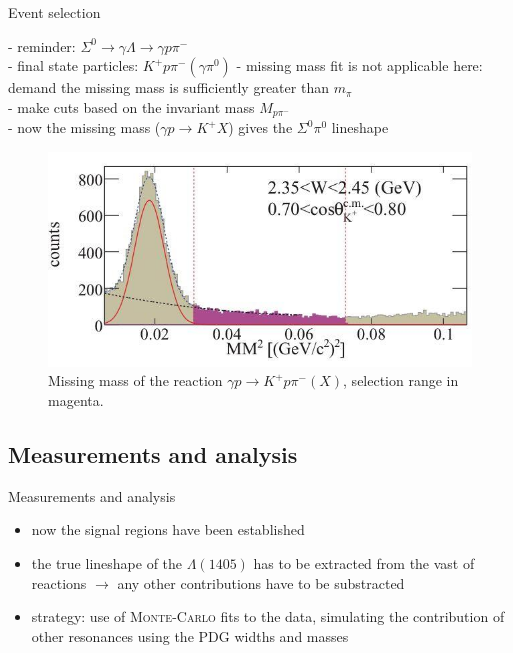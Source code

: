 \documentclass[11pt,aspectratio=1610,dvipsnames]{beamer}
\begin{document}
\begin{frame}{Event selection}
	\begin{minipage}{\linewidth}
		\begin{tcolorbox}[colback=black!10,colframe=gray!20!black,title=extracting $\Sigma^0\pi^0$] 
			- reminder: $\Sigma^0\to\gamma\Lambda\to\gamma p \pi^-$\\
			- final state particles: $K^+ p \pi^-(\gamma\pi^0)$
			- missing mass fit is not applicable here: \phantom{- }demand the missing mass is sufficiently greater than $m_\pi$\\
			- make cuts based on the invariant mass $M_{p\pi^-}$\\
			- now the missing mass ($\gamma p\to K^+ X$) gives the $\Sigma^0\pi^0$ lineshape
		\end{tcolorbox}	
	\end{minipage}
\begin{figure}
	\centering
	\includegraphics[width=.5\linewidth]{mism}
	\caption*{Missing  mass of the reaction $\gamma p \to K^+p\pi^-(X)$, selection range in magenta.  \citet{lineshapes}}
\end{figure}
\end{frame}


\subsection{Measurements and analysis}

\begin{frame}{Measurements and analysis}
	\begin{itemize}
		\item now the signal regions have been established
		\item the true lineshape of the $\Lambda(1405)$ has to be extracted from the vast of reactions $\to$ any other contributions have to be substracted
		\item strategy: use of \textsc{Monte-Carlo} fits to the data, simulating the contribution of other resonances using the PDG widths and masses
		
	\end{itemize}
\end{frame}
\end{document}
